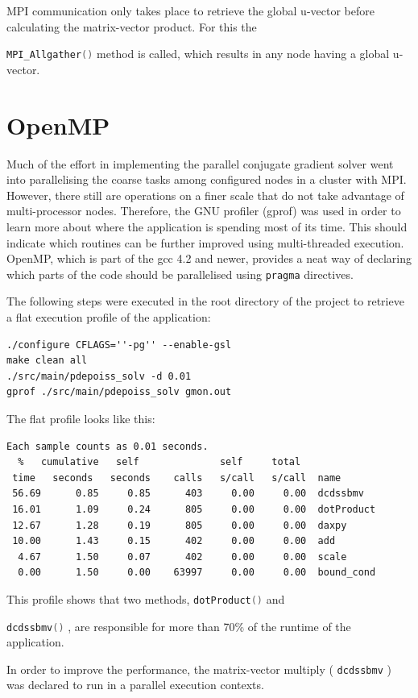 \documentclass[12pt,a4paper]{report}
\def\ccode#1{
  \lstinline[basicstyle=\ttfamily,language=C]{#1} }
\begin{document}
MPI communication only takes place to retrieve the global u-vector
before calculating the matrix-vector product. For this the
\ccode{MPI_Allgather()} method is called, which results in any node
having a global u-vector.

\section{OpenMP}
\label{sec:openmp}

Much of the effort in implementing the parallel conjugate gradient
solver went into parallelising the coarse tasks among configured nodes
in a cluster with MPI. However, there still are operations on a finer
scale that do not take advantage of multi-processor nodes. Therefore,
the GNU profiler (gprof) was used in order to learn more about where
the application is spending most of its time. This should indicate
which routines can be further improved using multi-threaded
execution. OpenMP, which is part of the gcc 4.2 and newer, provides a
neat way of declaring which parts of the code should be parallelised
using \ccode{pragma} directives.

The following steps were executed in the root directory of the project
to retrieve a flat execution profile of the application:

\begin{verbatim}
./configure CFLAGS=''-pg'' --enable-gsl
make clean all
./src/main/pdepoiss_solv -d 0.01
gprof ./src/main/pdepoiss_solv gmon.out
\end{verbatim}

The flat profile looks like this:
\begin{verbatim}
Each sample counts as 0.01 seconds.
  %   cumulative   self              self     total
 time   seconds   seconds    calls   s/call   s/call  name
 56.69      0.85     0.85      403     0.00     0.00  dcdssbmv
 16.01      1.09     0.24      805     0.00     0.00  dotProduct
 12.67      1.28     0.19      805     0.00     0.00  daxpy
 10.00      1.43     0.15      402     0.00     0.00  add
  4.67      1.50     0.07      402     0.00     0.00  scale
  0.00      1.50     0.00    63997     0.00     0.00  bound_cond
\end{verbatim}

This profile shows that two methods, \ccode{dotProduct()} and
\ccode{dcdssbmv()}, are responsible for more than 70\% of the runtime
of the application.

In order to improve the performance, the matrix-vector multiply
(\ccode{dcdssbmv}) was declared to run in a parallel execution
contexts.
\end{document}
